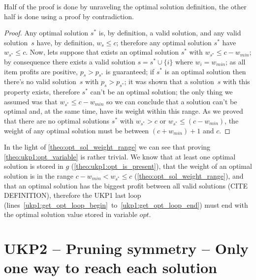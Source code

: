 \documentclass[12pt]{article}
\begin{document}
Half of the proof is done by unraveling the optimal solution definition, the other half is done using a proof by contradiction.

\begin{proof}
Any optimal solution \(s^*\) is, by definition, a valid solution, and any valid solution~\(s\) have, by definition, \(w_s \leq c\); therefore any optimal solution \(s^*\) have \(w_{s^*} \leq c\). Now, lets suppose that exists an optimal solution \(s^*\) with \({w_{s^*} \leq c - w_{min}}\); by consequence there exists a valid solution \(s = s^* \cup \{i\}\) where \(w_i = w_{min}\); as all item profits are positive, \(p_s > p_{s^*}\) is guaranteed; if \(s^*\) is an optimal solution then there's no valid solution~\(s\) with \(p_s > p_{s^*}\); it was shown that a solution~\(s\) with this property exists, therefore \(s^*\) can't be an optimal solution; the only thing we assumed was that \(w_{s^*} \leq c - w_{min}\) so we can conclude that a solution can't be optimal and, at the same time, have its weight within this range. As we proved that there are no optimal solutions \(s^*\) with \(w_{s^*} > c\) or \(w_{s^*} \leq (c - w_{min})\), the weight of any optimal solution must be between \((c + w_{min}) + 1\) and \(c\).
\end{proof}

In the light of \autoref{theo:opt_sol_weight_range} we can see that proving \autoref{theo:ukp1:opt_variable} is rather trivial. We know that at least one optimal solution is stored in \(g\) (\autoref{theo:ukp1:opt_is_present}), that the weight of an optimal solution is in the range \(c - w_{min} < w_{s^*} \leq c\) (\autoref{theo:opt_sol_weight_range}), and that an optimal solution has the biggest profit between all valid solutions (CITE DEFINITION), therefore the UKP1 last loop (lines~\ref{ukp1:get_opt_loop_begin}~to~\ref{ukp1:get_opt_loop_end}) must end with the optimal solution value stored in variable \(opt\).

\section{UKP2 -- Pruning symmetry -- Only one way to reach each solution}
\end{document}
